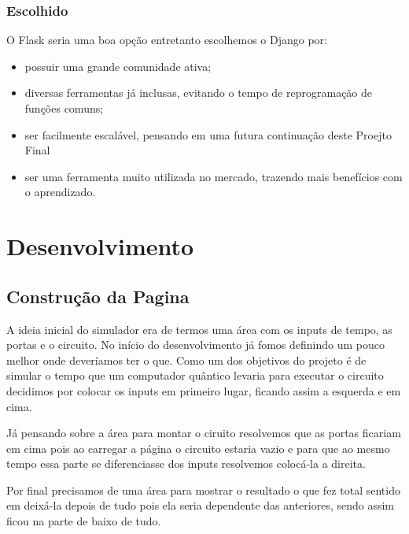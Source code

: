 \documentclass[a4paper, 12pt, oneside]{book}
\begin{document}
\subsection{Escolhido}
O Flask seria uma boa opção entretanto escolhemos o Django por:
\begin{itemize}
\item possuir uma grande comunidade ativa;
\item diversas ferramentas já inclusas, evitando o tempo de reprogramação de funções comuns;
\item ser facilmente escalável, pensando em uma futura continuação deste Proejto Final
\item ser uma ferramenta muito utilizada no mercado, trazendo mais benefícios com o aprendizado.
\end{itemize}


\chapter{Desenvolvimento}
\thispagestyle{empty} 

\section{Construção da Pagina}
A ideia inicial do simulador era de termos uma área com os inputs de tempo, as portas e o circuito. No início do desenvolvimento já fomos definindo um pouco melhor onde deveríamos ter o que. Como um dos objetivos do projeto é de simular o tempo que um computador quântico levaria para executar o circuito decidimos por colocar os inputs em primeiro lugar, ficando assim a esquerda e em cima. 

Já pensando sobre a área para montar o ciruito resolvemos que as portas ficariam em cima pois ao carregar a página o circuito estaria vazio e para que ao mesmo tempo essa parte se diferenciasse dos inputs resolvemos colocá-la a direita.

Por final precisamos de uma área para mostrar o resultado o que fez total sentido em deixá-la depois de tudo pois ela seria dependente das anteriores, sendo assim ficou na parte de baixo de tudo.
\end{document}
